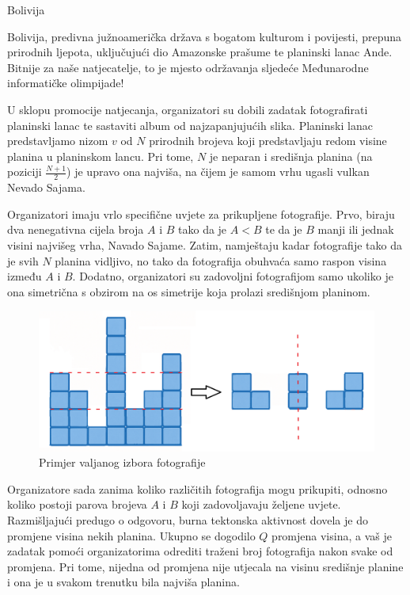 \begin{statement}[
  problempoints=100,
  timelimit=1 sekunda,
  memorylimit=512 MiB,
]{Bolivija}

Bolivija, predivna južnoamerička država s bogatom kulturom i povijesti, 
prepuna prirodnih ljepota, uključujući dio Amazonske prašume te planinski lanac Ande. 
Bitnije za naše natjecatelje, to je mjesto održavanja sljedeće Međunarodne informatičke 
olimpijade! 

U sklopu promocije natjecanja, organizatori su dobili zadatak 
fotografirati planinski lanac te sastaviti album od najzapanjujućih slika.
Planinski lanac predstavljamo nizom $v$ od $N$ prirodnih brojeva koji 
predstavljaju redom visine planina u planinskom lancu. 
Pri tome, $N$ je neparan i središnja planina (na poziciji $\frac{N+1}{2}$) je upravo ona najviša, 
na čijem je samom vrhu ugasli vulkan Nevado Sajama. 

Organizatori imaju vrlo specifične uvjete za prikupljene fotografije. 
Prvo, biraju dva nenegativna cijela broja $A$ i $B$ tako da je $A < B$ te da je $B$ manji ili 
jednak visini najvišeg vrha, Navado Sajame. 
Zatim, namještaju kadar fotografije tako da je svih $N$ planina vidljivo, no tako 
da fotografija obuhvaća samo raspon visina između $A$ i $B$. 
Dodatno, organizatori su zadovoljni fotografijom samo ukoliko je ona simetrična s 
obzirom na os simetrije koja prolazi središnjom planinom. 

\begin{figure}[!h]
      \centering
      \includegraphics[width=\linewidth]{pic/planine.png}
      \caption{Primjer valjanog izbora fotografije}
\end{figure}

Organizatore sada zanima koliko različitih fotografija mogu prikupiti, odnosno 
koliko postoji parova brojeva $A$ i $B$ koji zadovoljavaju željene uvjete. 
Razmišljajući predugo o odgovoru, burna tektonska aktivnost dovela je do promjene 
visina nekih planina. Ukupno se dogodilo $Q$ promjena visina, a vaš je zadatak 
pomoći organizatorima odrediti traženi broj fotografija nakon svake od promjena. 
Pri tome, nijedna od promjena nije utjecala na visinu središnje planine i ona je 
u svakom trenutku bila najviša planina. 


\end{statement}
